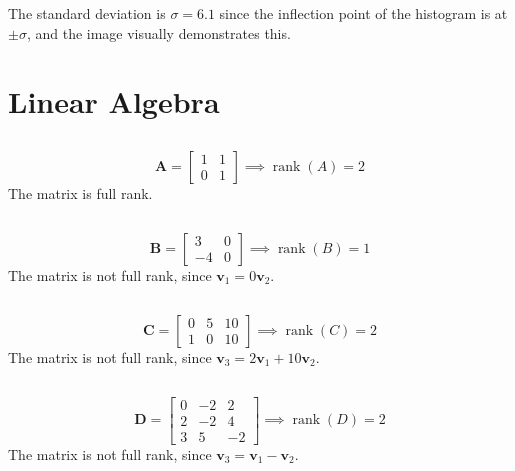 \documentclass{article}
\DeclareMathOperator{\rank}{rank}
\begin{document}
The standard deviation is \(\sigma = 6.1\) since the inflection point of the histogram is at \(\pm \sigma\), and the image visually demonstrates this.

\section{Linear Algebra}

\subsection{}

\begin{equation}
    \bm{A} =
    \begin{bmatrix}
        1 & 1 \\
        0 & 1
    \end{bmatrix} \implies \rank(A) = 2
\end{equation}
The matrix is full rank.

\subsection{}

\begin{equation}
    \bm{B} =
    \begin{bmatrix}
        3 & 0 \\
        -4 & 0
    \end{bmatrix} \implies \rank(B) = 1
\end{equation}
The matrix is not full rank, since \(\bm{v}_1 = 0\bm{v}_2\).

\subsection{}

\begin{equation}
    \bm{C} =
    \begin{bmatrix}
        0 & 5 & 10 \\
        1 & 0 & 10
    \end{bmatrix} \implies \rank(C) = 2
\end{equation}
The matrix is not full rank, since \(\bm{v}_3 = 2\bm{v}_1 + 10\bm{v}_2\).

\subsection{}

\begin{equation}
    \bm{D} =
    \begin{bmatrix}
        0 & -2 & 2 \\
        2 & -2 & 4 \\
        3 & 5 & -2
    \end{bmatrix} \implies \rank(D) = 2
\end{equation}
The matrix is not full rank, since \(\bm{v}_3 = \bm{v}_1 - \bm{v}_2\).
\end{document}
